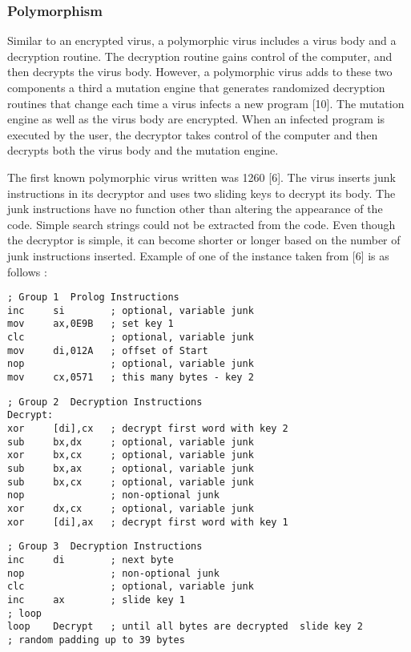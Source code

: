 \subsubsection{Polymorphism}
Similar to an encrypted virus, a polymorphic virus includes a virus body and a decryption routine. The decryption routine gains control of the computer, and then decrypts the virus body. However, a polymorphic virus adds to these two components a third \textemdash a mutation engine that generates randomized decryption routines that change each time a virus infects a new program [10]. The mutation engine as well as the virus body are encrypted. When an infected program is executed by the user, the decryptor takes control of the computer and then decrypts both the virus body and the mutation engine. 

The first known polymorphic virus written was 1260 [6]. The virus inserts junk instructions in its decryptor and uses two sliding keys to decrypt its body. The junk instructions have no function other than altering the appearance of the code. Simple search strings could not be extracted from the code. Even though the decryptor is simple, it can become shorter or longer based on the number of junk instructions inserted. Example of one of the instance taken from [6] is as follows :

\begin{verbatim}
; Group 1  Prolog Instructions
inc     si        ; optional, variable junk
mov     ax,0E9B   ; set key 1
clc               ; optional, variable junk
mov     di,012A   ; offset of Start
nop               ; optional, variable junk
mov     cx,0571   ; this many bytes - key 2
\end{verbatim}

\begin{verbatim}
; Group 2  Decryption Instructions
Decrypt:
xor     [di],cx   ; decrypt first word with key 2
sub     bx,dx     ; optional, variable junk
xor     bx,cx     ; optional, variable junk
sub     bx,ax     ; optional, variable junk
sub     bx,cx     ; optional, variable junk
nop               ; non-optional junk
xor     dx,cx     ; optional, variable junk
xor     [di],ax   ; decrypt first word with key 1
\end{verbatim}

\begin{verbatim}
; Group 3  Decryption Instructions
inc     di        ; next byte
nop               ; non-optional junk
clc               ; optional, variable junk
inc     ax        ; slide key 1
; loop
loop    Decrypt   ; until all bytes are decrypted  slide key 2
; random padding up to 39 bytes
\end{verbatim}

